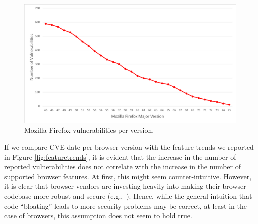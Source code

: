 \begin{figure}[ht]
    \centering
    \includegraphics[width=\columnwidth]{figures/Firefox-Vulnerabilities.png}
    \caption{Mozilla Firefox vulnerabilities per version.}
    \label{fig:firefox-vuln}
  \end{figure}


  If we compare CVE date per browser version with the feature trends
  we reported in Figure \ref{fig:featuretrends}, it is evident that
  the increase in the number of reported vulnerabilities does not
  correlate with the increase in the number of supported browser
  features. At first, this might seem counter-intuitive. However, it is
  clear that browser vendors are investing heavily into making their
  browser codebase more robust and secure
  (e.g.,~\cite{FirefoxCrashes,ChromeSecure}). Hence, while the general
  intuition that code ``bloating'' leads to more security problems may
  be correct, at least in the case of browsers, this assumption does
  not seem to hold true.
